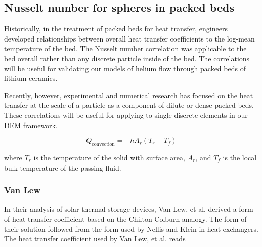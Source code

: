 \subsection{Nusselt number for spheres in packed beds}\label{sec:particle-convection}

Historically, in the treatment of packed beds for heat transfer, engineers developed relationships between overall heat transfer coefficients to the log-mean temperature of the bed. The Nusselt number correlation was applicable to the bed overall rather than any discrete particle inside of the bed. The correlations will be useful for validating our models of helium flow through packed beds of lithium ceramics.


Recently, however, experimental and numerical research has focused on the heat transfer at the scale of a particle as a component of dilute or dense packed beds. These correlations will be useful for applying to single discrete elements in our DEM framework.

\begin{equation}
	Q_\text{convection} = -hA_r(T_r-T_f)
\end{equation}

where $T_r$ is the temperature of the solid with surface area, $A_r$, and $T_f$ is the local bulk temperature of the passing fluid.

\subsubsection{Van Lew }

In their analysis of solar thermal storage devices, Van Lew, et al. derived a form of heat transfer coefficient based on the Chilton-Colburn analogy.\cite{vanlew133} The form of their solution followed from the form used by Nellis and Klein \cite{Nellis2009} in heat exchangers. The heat transfer coefficient used by Van Lew, et al. reads


